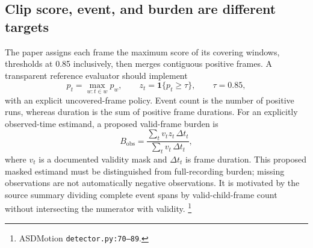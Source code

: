 \subsection{Clip score, event, and burden are different targets}
The paper assigns each frame the maximum score of its covering windows,
thresholds at 0.85 inclusively, then merges contiguous positive frames.
\cite{barami2024} A transparent reference evaluator should implement
\begin{equation}
 p_t=\max_{w:t\in w}p_w,\qquad
 z_t=\mathbf{1}\{p_t\geq\tau\},\qquad \tau=0.85,
\end{equation}
with an explicit uncovered-frame policy. Event count is the number of
positive runs, whereas duration is the sum of positive frame durations.
For an explicitly observed-time estimand, a proposed valid-frame burden is
\begin{equation}
 B_{\mathrm{obs}}=
 \frac{\sum_t v_t z_t\,\Delta t_t}{\sum_t v_t\,\Delta t_t},
\end{equation}
where $v_t$ is a documented validity mask and $\Delta t_t$ is frame duration.
This proposed masked estimand must be distinguished from full-recording
burden; missing observations are not automatically negative observations.
It is motivated by the source summary dividing complete event spans by
valid-child-frame count without intersecting the numerator with validity.
\footnote{ASDMotion \texttt{detector.py:70--89}.}

